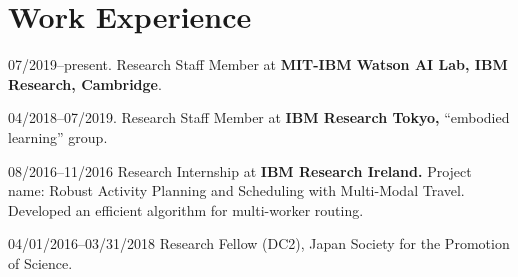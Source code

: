 \documentclass[letterpaper,11pt]{article}
\begin{document}
\section{Work Experience}

\begin{CV}
\item[07/2019--present.] Research Staff Member at \textbf{MIT-IBM Watson AI Lab, IBM Research, Cambridge}.

\item[04/2018--07/2019.] Research Staff Member at \textbf{IBM Research Tokyo,} ``embodied learning'' group.

\item[08/2016--11/2016] Research Internship at \textbf{IBM Research Ireland.}
 Project name: Robust Activity Planning and Scheduling with Multi-Modal Travel.
 Developed an efficient algorithm for multi-worker routing.

\item[04/01/2016--03/31/2018] Research Fellow (DC2), Japan Society for the Promotion of Science.




\end{CV}
\end{document}

